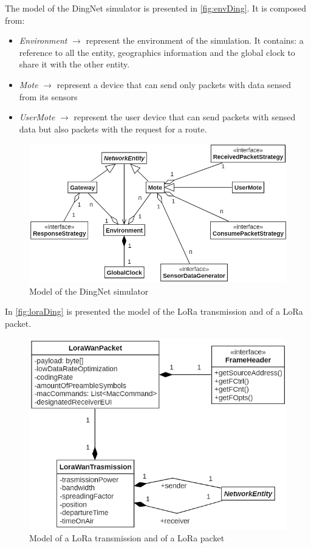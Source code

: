 The model of the DingNet simulator is presented in \autoref{fig:envDing}. It is composed from:
\begin{itemize}
    \item \textit{Environment} $\rightarrow$ represent the environment of the simulation. It contains: a reference to all the entity, geographics information and the global clock to share it with the other entity.
    \item \textit{Mote} $\rightarrow$ represent a device that can send only packets with data sensed from its sensors
    \item \textit{UserMote} $\rightarrow$ represent the user device that can send packets with sensed data but also packets with the request for a route.
\end{itemize}
\begin{figure}[h]
    \centering
    \includegraphics[scale=0.9]{images/envDing.png}
    \caption{Model of the DingNet simulator}
    \label{fig:envDing}
\end{figure}

In \autoref{fig:loraDing} is presented the model of the LoRa transmission and of a LoRa packet.

\begin{figure}[h]
    \centering
    \includegraphics[scale=0.9]{images/loraDing.png}
    \caption{Model of a LoRa transmission and of a LoRa packet}
    \label{fig:loraDing}
\end{figure}